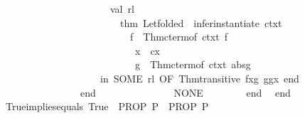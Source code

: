 \begin{isabellebody}
\ \ \ \ \ \ \ \ \ \ \ \ \ \ \ \ \ \ \ \ \ \ val\ rl\ {\isacharequal}{\kern0pt}\isanewline
\ \ \ \ \ \ \ \ \ \ \ \ \ \ \ \ \ \ \ \ \ \ \ \ {\isacharat}{\kern0pt}{\isacharbraceleft}{\kern0pt}thm\ Let{\isacharunderscore}{\kern0pt}folded{\isacharbraceright}{\kern0pt}\ {\isacharbar}{\kern0pt}{\isachargreater}{\kern0pt}\ infer{\isacharunderscore}{\kern0pt}instantiate\ ctxt\isanewline
\ \ \ \ \ \ \ \ \ \ \ \ \ \ \ \ \ \ \ \ \ \ \ \ \ \ {\isacharbrackleft}{\kern0pt}{\isacharparenleft}{\kern0pt}{\isacharparenleft}{\kern0pt}{\isachardoublequote}{\kern0pt}f{\isachardoublequote}{\kern0pt}{\isacharcomma}{\kern0pt}\ {}{\isacharparenright}{\kern0pt}{\isacharcomma}{\kern0pt}\ Thm{\isachardot}{\kern0pt}cterm{\isacharunderscore}{\kern0pt}of\ ctxt\ f{\isacharparenright}{\kern0pt}{\isacharcomma}{\kern0pt}\isanewline
\ \ \ \ \ \ \ \ \ \ \ \ \ \ \ \ \ \ \ \ \ \ \ \ \ \ \ {\isacharparenleft}{\kern0pt}{\isacharparenleft}{\kern0pt}{\isachardoublequote}{\kern0pt}x{\isachardoublequote}{\kern0pt}{\isacharcomma}{\kern0pt}\ {}{\isacharparenright}{\kern0pt}{\isacharcomma}{\kern0pt}\ cx{\isacharparenright}{\kern0pt}{\isacharcomma}{\kern0pt}\isanewline
\ \ \ \ \ \ \ \ \ \ \ \ \ \ \ \ \ \ \ \ \ \ \ \ \ \ \ {\isacharparenleft}{\kern0pt}{\isacharparenleft}{\kern0pt}{\isachardoublequote}{\kern0pt}g{\isachardoublequote}{\kern0pt}{\isacharcomma}{\kern0pt}\ {}{\isacharparenright}{\kern0pt}{\isacharcomma}{\kern0pt}\ Thm{\isachardot}{\kern0pt}cterm{\isacharunderscore}{\kern0pt}of\ ctxt\ abs{\isacharunderscore}{\kern0pt}g{\isacharprime}{\kern0pt}{\isacharparenright}{\kern0pt}{\isacharbrackright}{\kern0pt}{\isacharsemicolon}{\kern0pt}\isanewline
\ \ \ \ \ \ \ \ \ \ \ \ \ \ \ \ \ \ \ \ in\ SOME\ {\isacharparenleft}{\kern0pt}rl\ OF\ {\isacharbrackleft}{\kern0pt}Thm{\isachardot}{\kern0pt}transitive\ fx{\isacharunderscore}{\kern0pt}g\ g{\isacharunderscore}{\kern0pt}g{\isacharprime}{\kern0pt}x{\isacharbrackright}{\kern0pt}{\isacharparenright}{\kern0pt}\ end\isanewline
\ \ \ \ \ \ \ \ \ \ \ \ \ \ \ \ end\isanewline
\ \ \ \ \ \ \ \ \ \ \ \ {\isacharbar}{\kern0pt}\ {\isacharunderscore}{\kern0pt}\ {\isacharequal}{\kern0pt}{\isachargreater}{\kern0pt}\ NONE{\isacharparenright}{\kern0pt}\isanewline
\ \ \ \ \ \ \ \ end\isanewline
\ \ end\isanewline
{\isacartoucheclose}%
\endisatagML
{\isafoldML}%
%
\isadelimML
%
\endisadelimML
\isanewline
\isanewline
{}\isamarkupfalse%
\ True{\isacharunderscore}{\kern0pt}implies{\isacharunderscore}{\kern0pt}equals{\isacharcolon}{\kern0pt}\ {\isachardoublequoteopen}{\isacharparenleft}{\kern0pt}True\ {\isasymLongrightarrow}\ PROP\ P{\isacharparenright}{\kern0pt}\ {\isasymequiv}\ PROP\ P{\isachardoublequoteclose}\isanewline

\end{isabellebody}
